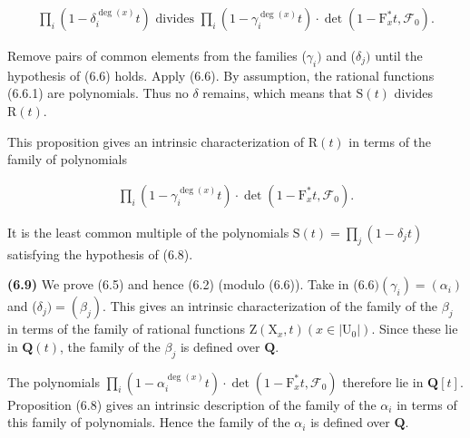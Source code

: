 \documentclass[10pt,leqno]{article}
\begin{document}
\begin{equation*}\begin{gathered}\prod _{i}(1- \delta _{i}^{\operatorname{deg}(x)}t)\text{ divides }\prod _{i}(1- \gamma _{i}^{\operatorname{deg}(x)}t)\cdot \operatorname{det}(1- \mathrm{F}_{x}^{*}t,\mathcal{F} _{0}).\end{gathered}\end{equation*}

\par

\noindent Remove pairs of common elements from the families (\(\gamma _{i})\) and (\(\delta _{j})\) until the hypothesis of (6.6) holds. Apply (6.6). By assumption, the rational functions (6.6.1) are polynomials. Thus no \(\delta \) remains, which means that \(\mathrm{S}(t)\) divides \(\mathrm{R}(t)\).\par

\noindent This proposition gives an intrinsic characterization of \(\mathrm{R}(t)\) in terms of the family of polynomials\par

\begin{equation*}\begin{gathered}\prod _{i}(1- \gamma _{i}^{\operatorname{deg}(x)}t)\cdot \operatorname{det}(1- \mathrm{F}_{x}^{*}t,\mathcal{F} _{0}).\end{gathered}\end{equation*}

\noindent It is the least common multiple of the polynomials \(\mathrm{S}(t)=\prod _{j}(1- \delta _{j} t)\) satisfying the hypothesis of (6.8).\par

\noindent \textbf{(6.9)} We prove (6.5) and hence (6.2) (modulo (6.6)). Take in (\(6.6) (\gamma _{i})=(\alpha _{i})\) and (\(\delta _{j})=(\beta _{j})\). This gives an intrinsic characterization of the family of the \(\beta _{j}\) in terms of the family of rational functions \(\mathrm{Z}(\mathrm{X}_{x},t) (x\in |\mathrm{U}_{0}|)\). Since these lie in \(\mathbf{Q}(t)\), the family of the \(\beta _{j}\) is defined over \(\mathbf{Q}\).\par

\noindent The polynomials \(\prod _{i}(1- \alpha _{i}^{\operatorname{deg}(x)}t)\cdot \operatorname{det}(1- \mathrm{F}_{x}^{*}t,\mathcal{F} _{0})\) therefore lie in \(\mathbf{Q}[t]\). Proposition (6.8) gives an intrinsic description of the family of the \(\alpha _{i}\) in terms of this family of polynomials. Hence the family of the \(\alpha _{i}\) is defined over \(\mathbf{Q}\).\par
\end{document}

